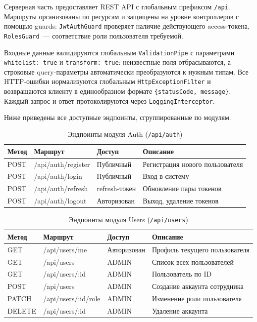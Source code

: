 Серверная часть предоставляет REST API с глобальным префиксом
\texttt{/api}. Маршруты организованы по ресурсам и защищены на уровне
контроллеров с помощью guards: \texttt{JwtAuthGuard} проверяет наличие
действующего access-токена, \texttt{RolesGuard}~--- соответствие роли
пользователя требуемой.

Входные данные валидируются глобальным \texttt{ValidationPipe}
с параметрами \texttt{whitelist: true} и \texttt{transform: true}:
неизвестные поля отбрасываются, а строковые query-параметры
автоматически преобразуются к нужным типам. Все HTTP-ошибки
нормализуются глобальным \texttt{HttpExceptionFilter} и возвращаются
клиенту в единообразном формате \texttt{\{statusCode, message\}}.
Каждый запрос и ответ протоколируются через \texttt{LoggingInterceptor}.

Ниже приведены все доступные эндпоинты, сгруппированные по модулям.

\begin{table}[H]
\centering
\caption{Эндпоинты модуля Auth (\texttt{/api/auth})}
\label{tab:api_auth}
\begin{tabular}{|p{1.4cm}|p{5.8cm}|p{2.6cm}|p{4.8cm}|}
\hline
\textbf{Метод} & \textbf{Маршрут} & \textbf{Доступ} &
\textbf{Описание} \\
\hline
POST & /api/auth/register & Публичный &
  Регистрация нового пользователя \\ \hline
POST & /api/auth/login    & Публичный &
  Вход в систему \\ \hline
POST & /api/auth/refresh  & refresh-токен &
  Обновление пары токенов \\ \hline
POST & /api/auth/logout   & Авторизован &
  Выход, удаление токенов \\ \hline
\end{tabular}
\end{table}

\begin{table}[H]
\centering
\caption{Эндпоинты модуля Users (\texttt{/api/users})}
\label{tab:api_users}
\begin{tabular}{|p{1.8cm}|p{5.4cm}|p{2.6cm}|p{4.8cm}|}
\hline
\textbf{Метод} & \textbf{Маршрут} & \textbf{Доступ} &
\textbf{Описание} \\
\hline
GET    & /api/users/me        & Авторизован &
  Профиль текущего пользователя \\ \hline
GET    & /api/users           & ADMIN &
  Список всех пользователей \\ \hline
GET    & /api/users/:id       & ADMIN &
  Пользователь по ID \\ \hline
POST   & /api/users           & ADMIN &
  Создание аккаунта сотрудника \\ \hline
PATCH  & /api/users/:id/role  & ADMIN &
  Изменение роли пользователя \\ \hline
DELETE & /api/users/:id       & ADMIN &
  Удаление аккаунта \\ \hline
\end{tabular}
\end{table}

